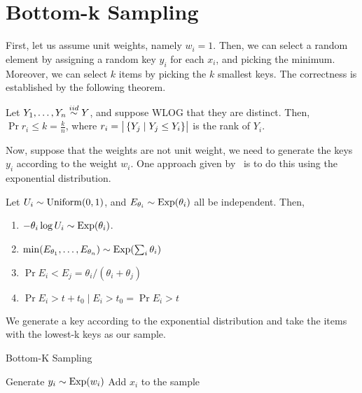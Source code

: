 \documentclass{article}
\begin{document}
\section{Bottom-k Sampling}
\label{sec:bottomk}

First, let us assume unit weights, namely $w_i = 1$.
Then, we can select a random element by assigning a random key $y_i$ for each $x_i$, and picking the minimum.
Moreover, we can select $k$ items by picking the $k$ smallest keys.
The correctness is established by the following theorem.

\begin{theorem}
	\label{thm:rank}
	Let $Y_1, \ldots, Y_n \overset{iid}{\sim} Y$, and suppose WLOG that they are distinct.
	Then, $\Pr{r_i \le k} = \frac{k}{n}$, where $r_i = \left| \bigr. \left\{ Y_j \mid Y_j \le Y_i \right\} \right|$ is the rank of $Y_i$.
\end{theorem}

Now, suppose that the weights are not unit weight, we need to generate the keys $y_i$ according to the weight $w_i$.
One approach given by~\cite{cohen07-08} is to do this using the exponential distribution.

\begin{lemma}
	Let $U_i \sim \operatorname{Uniform}(0, 1)$, and $E_{\theta_i} \sim \operatorname{Exp}(\theta_i)$ all be independent.
	Then,
	\begin{enumerate}
		\item $-\theta_i \log U_i \sim \operatorname{Exp}(\theta_i)$.
		\item $\min(E_{\theta_1}, \ldots, E_{\theta_{n}}) \sim \operatorname{Exp}(\sum_i \theta_i)$
		\item $\Pr{E_i < E_j} = \theta_i / (\theta_i + \theta_j)$
		\item $\Pr{E_i > t + t_0 \mid E_i > t_0} = \Pr{E_i > t}$
	\end{enumerate}
\end{lemma}

We generate a key according to the exponential distribution and take the items with the lowest-k keys as our sample.
\begin{algorithm}
	\caption{Bottom-K Sampling}
	\begin{algorithmic}[1]
				\State Generate $y_i \sim \operatorname{Exp}(w_i)$
					\State Add $x_i$ to the sample
				\EndIf
			\EndFor
		\EndFunction
	\end{algorithmic}
\end{algorithm}
\end{document}
